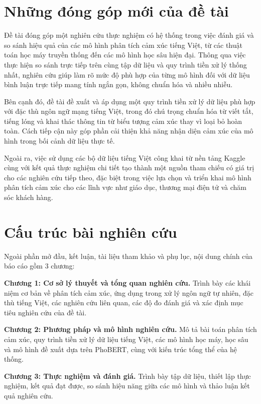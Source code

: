 \documentclass[14pt, a4paper]{report}
\begin{document}
\section{Những đóng góp mới của đề tài}

Đề tài đóng góp một nghiên cứu thực nghiệm có hệ thống trong việc đánh giá và so sánh hiệu quả của các mô hình phân tích cảm xúc tiếng Việt, từ các thuật toán học máy truyền thống đến các mô hình học sâu hiện đại. Thông qua việc thực hiện so sánh trực tiếp trên cùng tập dữ liệu và quy trình tiền xử lý thống nhất, nghiên cứu giúp làm rõ mức độ phù hợp của từng mô hình đối với dữ liệu bình luận trực tiếp mang tính ngắn gọn, không chuẩn hóa và nhiều nhiễu.

Bên cạnh đó, đề tài đề xuất và áp dụng một quy trình tiền xử lý dữ liệu phù hợp với đặc thù ngôn ngữ mạng tiếng Việt, trong đó chú trọng chuẩn hóa từ viết tắt, tiếng lóng và khai thác thông tin từ biểu tượng cảm xúc thay vì loại bỏ hoàn toàn. Cách tiếp cận này góp phần cải thiện khả năng nhận diện cảm xúc của mô hình trong bối cảnh dữ liệu thực tế.

Ngoài ra, việc sử dụng các bộ dữ liệu tiếng Việt công khai từ nền tảng Kaggle cùng với kết quả thực nghiệm chi tiết tạo thành một nguồn tham chiếu có giá trị cho các nghiên cứu tiếp theo, đặc biệt trong việc lựa chọn và triển khai mô hình phân tích cảm xúc cho các lĩnh vực như giáo dục, thương mại điện tử và chăm sóc khách hàng.

\section{Cấu trúc bài nghiên cứu}

Ngoài phần mở đầu, kết luận, tài liệu tham khảo và phụ lục, nội dung chính của báo cáo gồm 3 chương:

\textbf{Chương 1: Cơ sở lý thuyết và tổng quan nghiên cứu.} Trình bày các khái niệm cơ bản về phân tích cảm xúc, ứng dụng trong xử lý ngôn ngữ tự nhiên, đặc thù tiếng Việt, các nghiên cứu liên quan, các độ đo đánh giá và xác định mục tiêu nghiên cứu của đề tài.

\textbf{Chương 2: Phương pháp và mô hình nghiên cứu.} Mô tả bài toán phân tích cảm xúc, quy trình tiền xử lý dữ liệu tiếng Việt, các mô hình học máy, học sâu và mô hình đề xuất dựa trên PhoBERT, cùng với kiến trúc tổng thể của hệ thống.

\textbf{Chương 3: Thực nghiệm và đánh giá.} Trình bày tập dữ liệu, thiết lập thực nghiệm, kết quả đạt được, so sánh hiệu năng giữa các mô hình và thảo luận kết quả nghiên cứu.
\end{document}
